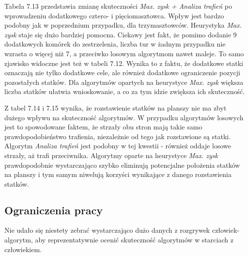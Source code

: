 Tabela 7.13 przedstawia zmianę skuteczności \emph{Max. zysk + Analiza trafień} po wprowadzeniu dodatkowego cztero- i pięciomasztowca. Wpływ jest bardzo podobny jak w poprzednium przypadku, dla trzymasztowców. Heurystyka \emph{Max. zysk} staje się dużo bardziej pomocna. Ciekawy jest fakt, że pomimo dodanie 9 dodatkowych komórek do zestrzelenia, liczba tur w żadnym przypadku nie wzrasta o więcej niż 7, a przeciwko losowym algorytmom nawet maleje. To samo zjawisko widoczne jest też w tabeli 7.12. Wynika to z faktu, że dodatkowe statki oznaczają nie tylko dodatkowe cele, ale również dodatkowe ograniczenie pozycji pozostałych statków. Dla algorytmów opartych na heurystyce \emph{Max. zysk} większa liczba statków ułatwia wnioskowanie, a co za tym idzie zwiększa ich skuteczność.

Z tabel 7.14 i 7.15 wynika, że rozstawienie statków na planszy nie ma zbyt dużego wpływu na skuteczność algorytmów. W przypadku algorytmów losowych jest to spowodowane faktem, że strzały obu stron mają takie samo prawdopodobieństwo trafienia, niezależnie od tego jak rozstawione są statki. Algorytm \emph{Analiza trafień} jest podobny w tej kwestii - również oddaje losowe strzały, aż trafi przeciwnika. Algorytmy oparte na heurystyce \emph{Max. zysk} prawdopodobnie wystarczająco szybko eliminują potencjalne położenia statków na planszy i tym samym niwelują korzyści wynikające z danego rozstawienia statków.

\subsection{Ograniczenia pracy}
Nie udało się niestety zebrać wystarczająco dużo danych z rozgrywek człowiek-algorytm, aby reprezentatywnie ocenić skuteczność algorytmów w starciach z człowiekiem.
